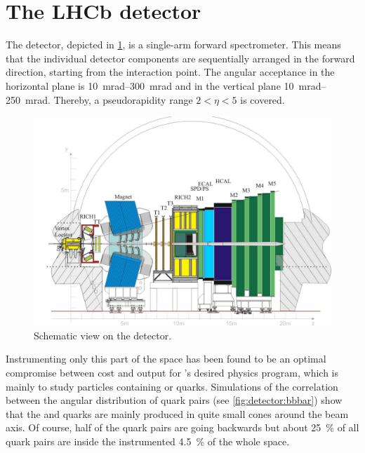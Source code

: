 
\section{The LHCb detector}
\label{sec:detector:lhcb}

The \lhcb detector, depicted in \cref{fig:detector:scheme}, is a single-arm
forward spectrometer. This means that the individual detector
components are sequentially arranged in the forward direction, starting from
the interaction point. The angular acceptance in the horizontal plane is
\SIrange{10}{300}{mrad} and in the vertical plane \SIrange{10}{250}{mrad}.
Thereby, a pseudorapidity range $2<\eta <5$ is covered.
\begin{figure}[htb]
\centering
\includegraphics[width=\textwidth]{04-Detector/figs/Lhcbdetektor.pdf}
\caption{Schematic view on the \lhcb detector\cite{Alves:2008zz}.}
\label{fig:detector:scheme}
\end{figure}
Instrumenting only this part of the space has been found to be an optimal
compromise between cost and output for \lhcb's desired physics program, which
is mainly to study particles containing \bquark or \cquark quarks. Simulations
of the correlation between the angular distribution of \bbbar quark pairs (see
\cref{fig:detector:bbbar}) show that the \bquark and \bquarkbar quarks are
mainly produced in quite small cones around the beam axis. Of course, half of
the \bbbar quark pairs are going backwards but about \SI{25}{\percent} of all
\bbbar quark pairs are inside the instrumented \SI{4.5}{\percent} of the whole
space.
